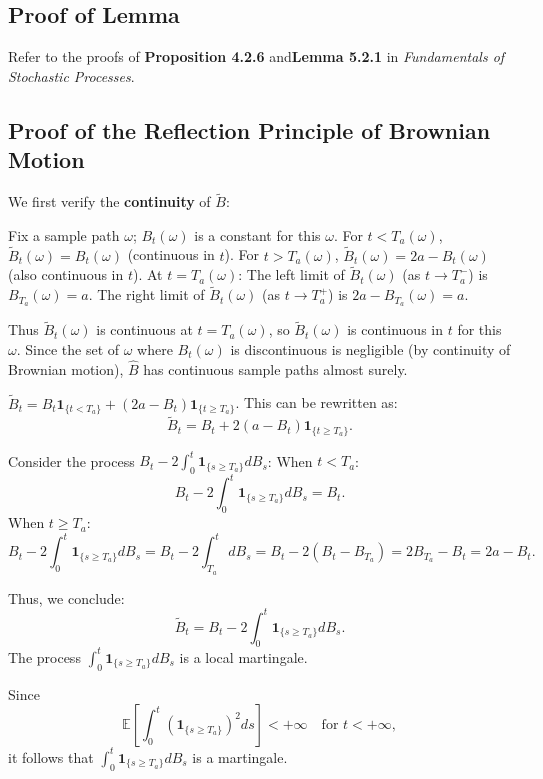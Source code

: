 \documentclass[12pt,a4paper]{article}
\theoremstyle{definition}
\begin{document}
	\subsection{Proof of Lemma}
	
	Refer to the proofs of \textbf{Proposition 4.2.6} and\textbf{Lemma 5.2.1} in \textit{Fundamentals of Stochastic Processes}.
	
	\subsection{Proof of the Reflection Principle of Brownian Motion}
	We first verify the \textbf{continuity} of $\widetilde{B}$:
	
	Fix a sample path $\omega$; $B_t(\omega)$ is a constant for this $\omega$.  For $t < T_a(\omega)$, $\widetilde{B}_t(\omega) = B_t(\omega)$ (continuous in $t$). For $t > T_a(\omega)$, $\widetilde{B}_t(\omega) = 2a - B_t(\omega)$ (also continuous in $t$). At $t = T_a(\omega)$:
	The left limit of $\widetilde{B}_t(\omega)$ (as $t \to T_a^-$) is $B_{T_a}(\omega) = a$.
	The right limit of $\widetilde{B}_t(\omega)$ (as $t \to T_a^+$) is $2a - B_{T_a}(\omega) = a$.
	
	Thus $\widetilde{B}_t(\omega)$ is continuous at $t = T_a(\omega)$, so $\widetilde{B}_t(\omega)$ is continuous in $t$ for this $\omega$. Since the set of $\omega$ where $B_t(\omega)$ is discontinuous is negligible (by continuity of Brownian motion), $\hat{B}$ has continuous sample paths almost surely.
	

 \( \widetilde{B}_t = B_t \mathbf{1}_{\{t < T_a\}} + (2a - B_t) \mathbf{1}_{\{t \geq T_a\}} \).
This can be rewritten as:
\[
\widetilde{B}_t = B_t + 2(a - B_t) \mathbf{1}_{\{t \geq T_a\}}.
\]

Consider the process \( B_t - 2\int_0^t \mathbf{1}_{\{s \geq T_a\}} dB_s \):
 When \( t < T_a \):
\[
B_t - 2\int_0^t \mathbf{1}_{\{s \geq T_a\}} dB_s = B_t.
\]
 When \( t \geq T_a \):
\[
B_t - 2\int_0^t \mathbf{1}_{\{s \geq T_a\}} dB_s = B_t - 2\int_{T_a}^t dB_s = B_t - 2(B_t - B_{T_a}) = 2B_{T_a} - B_t = 2a - B_t.
\]

Thus, we conclude:
\[
\widetilde{B}_t = B_t - 2\int_0^t \mathbf{1}_{\{s \geq T_a\}} dB_s.
\]
The process \( \int_0^t \mathbf{1}_{\{s \geq T_a\}} dB_s \) is a local martingale.

Since
\[
\mathbb{E}\left[ \int_0^t \left( \mathbf{1}_{\{s \geq T_a\}} \right)^2 ds \right] < +\infty \quad \text{for } t < +\infty,
\]
it follows that \( \int_0^t \mathbf{1}_{\{s \geq T_a\}} dB_s \) is a martingale.
\end{document}
